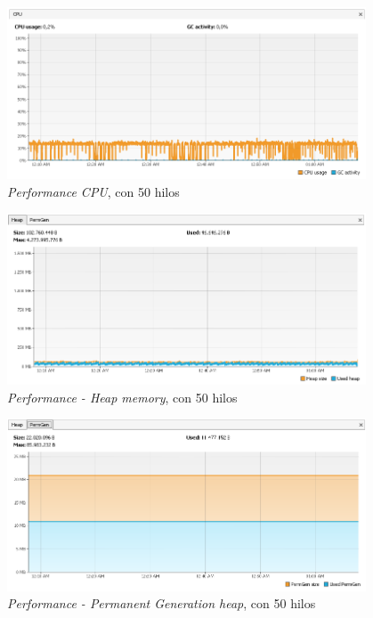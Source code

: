 \begin{figure}[H]
\centering
\includegraphics[width=0.95\textwidth]{images/Performance_CPU_50_Threads}
\caption{\emph{Performance CPU}, con 50 hilos}
\label{fig:6.33}
\end{figure}

\begin{figure}[H]
\centering
\includegraphics[width=0.95\textwidth]{images/Performance_HEAP_50_Threads}
\caption{\emph{Performance - Heap memory}, con 50 hilos}
\label{fig:6.34}
\end{figure}

\begin{figure}[H]
\centering
\includegraphics[width=0.95\textwidth]{images/Performance_PERM_50_Threads}
\caption{\emph{Performance - Permanent Generation heap}, con 50 hilos}
\label{fig:6.35}
\end{figure}

